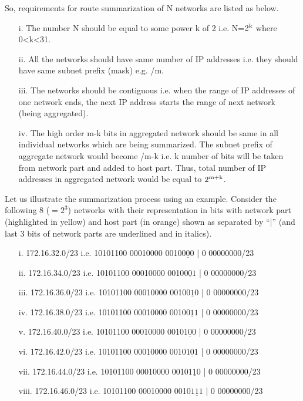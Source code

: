 \begin{multicols}{2}
So, requirements for route summarization of N networks are listed as below. 
\begin{itemize}
\item[i.] The number N should be equal to some power k of 2 i.e. N=$2^{\rm k}$ where 0<k<31.
\item[ii.] All the networks should have same number of IP addresses i.e. they should have same subnet prefix (mask) e.g. /m.
\item[iii.] The networks should be contiguous i.e. when the range of IP addresses of one network ends, the next IP address starts the range of next network (being aggregated).
\item[iv.] The high order m-k bits in aggregated network should be same in all individual networks which are being summarized. The subnet prefix of aggregate network would become /m-k i.e. k number of bits will be taken from network part and added to host part. Thus, total number of IP addresses in aggregated network would be equal to $2^{\rm m+k}$.
\end{itemize}

Let us illustrate the summarization process using an example. Consider the following 8 ($=2^{3}$) networks with their representation in bits with network part (highlighted in yellow) and host part (in orange) shown as separated by “|” (and last 3 bits of network parts are underlined and in italics).
\begin{itemize}
\item[i.] 172.16.32.0/23 i.e. 10101100 00010000 0010$\underline{\textit{000}}$ | 0 00000000/23
\item[ii.] 172.16.34.0/23 i.e. 10101100 00010000 0010$\underline{\textit{001}}$ | 0 00000000/23
\item[iii.] 172.16.36.0/23 i.e. 10101100 00010000 0010$\underline{\textit{010}}$ | 0 00000000/23
\item[iv.] 172.16.38.0/23 i.e. 10101100 00010000 0010$\underline{\textit{011}}$ | 0 00000000/23
\item[v.] 172.16.40.0/23 i.e. 10101100 00010000 0010$\underline{\textit{100}}$ | 0 00000000/23
\item[vi.] 172.16.42.0/23 i.e. 10101100 00010000 0010$\underline{\textit{101}}$ | 0 00000000/23
\item[vii.] 172.16.44.0/23 i.e. 10101100 00010000 0010$\underline{\textit{110}}$ | 0 00000000/23
\item[viii.] 172.16.46.0/23 i.e. 10101100 00010000 0010$\underline{\textit{111}}$ | 0 00000000/23
\end{itemize}


\end{multicols}
